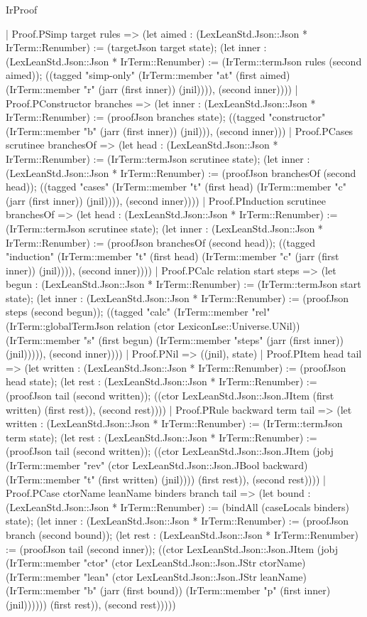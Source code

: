 \begin{lexlean}{IrProof}
\begin{semanticmodule}
{    | Proof.PSimp target rules => (let aimed : (LexLeanStd.Json::Json * IrTerm::Renumber) := (targetJson target state); (let inner : (LexLeanStd.Json::Json * IrTerm::Renumber) := (IrTerm::termJson rules (second aimed)); ((tagged "simp-only" (IrTerm::member "at" (first aimed) (IrTerm::member "r" (jarr (first inner)) (jnil)))), (second inner))))
    | Proof.PConstructor branches => (let inner : (LexLeanStd.Json::Json * IrTerm::Renumber) := (proofJson branches state); ((tagged "constructor" (IrTerm::member "b" (jarr (first inner)) (jnil))), (second inner)))
    | Proof.PCases scrutinee branchesOf => (let head : (LexLeanStd.Json::Json * IrTerm::Renumber) := (IrTerm::termJson scrutinee state); (let inner : (LexLeanStd.Json::Json * IrTerm::Renumber) := (proofJson branchesOf (second head)); ((tagged "cases" (IrTerm::member "t" (first head) (IrTerm::member "c" (jarr (first inner)) (jnil)))), (second inner))))
    | Proof.PInduction scrutinee branchesOf => (let head : (LexLeanStd.Json::Json * IrTerm::Renumber) := (IrTerm::termJson scrutinee state); (let inner : (LexLeanStd.Json::Json * IrTerm::Renumber) := (proofJson branchesOf (second head)); ((tagged "induction" (IrTerm::member "t" (first head) (IrTerm::member "c" (jarr (first inner)) (jnil)))), (second inner))))
    | Proof.PCalc relation start steps => (let begun : (LexLeanStd.Json::Json * IrTerm::Renumber) := (IrTerm::termJson start state); (let inner : (LexLeanStd.Json::Json * IrTerm::Renumber) := (proofJson steps (second begun)); ((tagged "calc" (IrTerm::member "rel" (IrTerm::globalTermJson relation (ctor LexiconLse::Universe.UNil)) (IrTerm::member "s" (first begun) (IrTerm::member "steps" (jarr (first inner)) (jnil))))), (second inner))))
    | Proof.PNil => ((jnil), state)
    | Proof.PItem head tail => (let written : (LexLeanStd.Json::Json * IrTerm::Renumber) := (proofJson head state); (let rest : (LexLeanStd.Json::Json * IrTerm::Renumber) := (proofJson tail (second written)); ((ctor LexLeanStd.Json::Json.JItem (first written) (first rest)), (second rest))))
    | Proof.PRule backward term tail => (let written : (LexLeanStd.Json::Json * IrTerm::Renumber) := (IrTerm::termJson term state); (let rest : (LexLeanStd.Json::Json * IrTerm::Renumber) := (proofJson tail (second written)); ((ctor LexLeanStd.Json::Json.JItem (jobj (IrTerm::member "rev" (ctor LexLeanStd.Json::Json.JBool backward) (IrTerm::member "t" (first written) (jnil)))) (first rest)), (second rest))))
    | Proof.PCase ctorName leanName binders branch tail => (let bound : (LexLeanStd.Json::Json * IrTerm::Renumber) := (bindAll (caseLocals binders) state); (let inner : (LexLeanStd.Json::Json * IrTerm::Renumber) := (proofJson branch (second bound)); (let rest : (LexLeanStd.Json::Json * IrTerm::Renumber) := (proofJson tail (second inner)); ((ctor LexLeanStd.Json::Json.JItem (jobj (IrTerm::member "ctor" (ctor LexLeanStd.Json::Json.JStr ctorName) (IrTerm::member "lean" (ctor LexLeanStd.Json::Json.JStr leanName) (IrTerm::member "b" (jarr (first bound)) (IrTerm::member "p" (first inner) (jnil)))))) (first rest)), (second rest)))))
}
\end{semanticmodule}
\end{lexlean}
